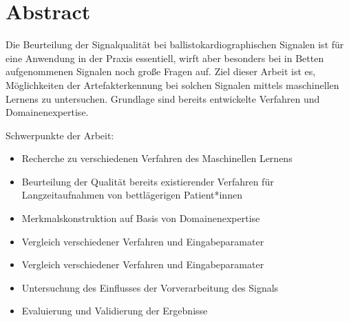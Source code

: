 \clearpage
\chapter*{Abstract}\label{abstract}

Die Beurteilung der Signalqualität bei ballistokardiographischen Signalen ist für eine Anwendung in der Praxis essentiell, wirft aber besonders bei in Betten aufgenommenen Signalen noch große Fragen auf. Ziel dieser Arbeit ist es, Möglichkeiten der Artefakterkennung bei solchen Signalen mittels maschinellen Lernens zu untersuchen. Grundlage sind bereits entwickelte Verfahren und Domainenexpertise. 

Schwerpunkte der Arbeit:
\begin{itemize}
	\item Recherche zu verschiedenen Verfahren des Maschinellen Lernens
	\item Beurteilung der Qualität bereits existierender Verfahren für Langzeitaufnahmen von bettlägerigen Patient*innen
	\item Merkmalskonstruktion auf Basis von Domainenexpertise
	\item Vergleich verschiedener Verfahren und Eingabeparamater
	\item Vergleich verschiedener Verfahren und Eingabeparamater
	\item Untersuchung des Einflusses der Vorverarbeitung des Signals
	\item Evaluierung und Validierung der Ergebnisse
\end{itemize}
